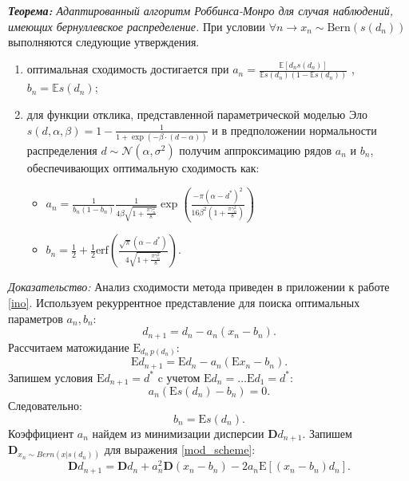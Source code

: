\textit{\textbf{Теорема:} Адаптированный алгоритм Роббинса-Монро для случая наблюдений, имеющих бернуллевское распределение.} \label{algo} 
При условии $\forall n \rightarrow x_n \sim \text{Bern}(s(d_n))$ выполняются следующие утверждения. 
\begin{enumerate}
    \item оптимальная сходимость достигается при $a_n = \frac{\mathbb{E}[d_n s(d_n)]}{\mathbb{E}s(d_n)(1 - \mathbb{E}s(d_n))}$ , $b_n =\mathbb{E} s(d_n)$;
    \item для функции отклика, представленной параметрической моделью Эло $s(d,\alpha,\beta) = 1 - \frac{1}{1+\exp\left(-\beta \cdot(d -\alpha)\right)}$
     и в предположении нормальности распределения $d \sim \mathcal{N}(\alpha,\sigma^2)$ получим аппроксимацию рядов $a_n$ и $b_n$, обеспечивающих оптимальную сходимость как:
     \begin{itemize}
        \item $a_n = \frac{1}{b_n(1-b_n)} \frac{1}{4  \beta \sqrt{1+\frac{\pi\gamma_n^2}{8}}} \exp\left( \frac{- \pi (\alpha-d^*)^2}{16  \beta^2 ( 1+\frac{\pi\gamma_n^2}{8})}\right)$
        \item $b_n = \frac{1}{2} + \frac{1}{2} \text{erf}\left(\frac{\sqrt{\pi} (\alpha-d^*)}{4 \sqrt{1+\frac{\pi\gamma_n^2}{8}}} \right)$.
    \end{itemize} 
\end{enumerate}
\textit{Доказательство:}
Анализ сходимости метода приведен в приложении к работе \ref{ino}.
Используем рекуррентное представление для поиска оптимальных параметров $a_n,b_n$:
\begin{equation}
    d_{n+1} = d_n -  a_n(x_n-b_n).
    \label{mod_scheme}
\end{equation}
Рассчитаем матожидание $\mathrm{E}_{d_n ~ p(d_n)}$:
\begin{equation}
    \mathrm{E} d_{n+1} = \mathrm{E} d_n -  a_n(\mathrm{E}x_n-b_n).
\end{equation}
Запишем условия $\mathrm{E} d_{n+1} = d^*$ c учетом $\mathrm{E} d_{n} = \dots \mathrm{E} d_{1}= d^*$:
\begin{equation}
    a_n (\mathrm{E} s(d_n) - b_n)  =0.
\end{equation}
Следовательно:
\begin{equation}
    \label{b_n}
    b_n = \mathrm{E} s(d_n).
\end{equation}
Коэффициент $a_n$ найдем из минимизации дисперсии $\mathbf{D} d_{n+1}$. Запишем $\mathbf{D}_{x_n \sim Bern(x | s(d_n))}$ для выражения \ref{mod_scheme}:
\begin{equation}
    \label{disp}
    \mathbf{D} d_{n+1} = \mathbf{D} d_n + a_n^2 \mathbf{D} (x_n-b_n)  - 2 a_n \mathrm{E}\left[(x_n-b_n)d_n\right].
\end{equation}
